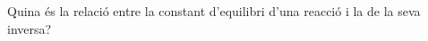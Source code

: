 \begin{exr}
Quina és la relació entre la constant d'equilibri d'una reacció i la de la seva inversa?
\end{exr}